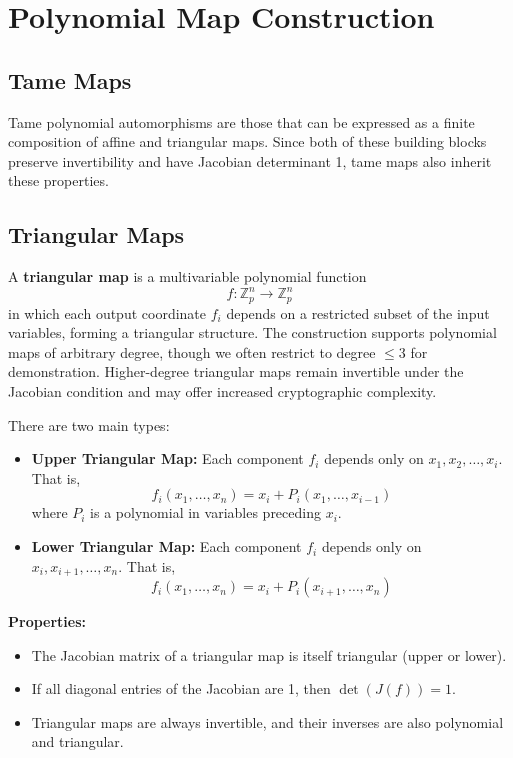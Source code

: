 \documentclass[12pt]{article}
\begin{document}
\section{Polynomial Map Construction}

\subsection*{Tame Maps}
Tame polynomial automorphisms are those that can be expressed as a finite composition of affine and triangular maps. Since both of these building blocks preserve invertibility and have Jacobian determinant 1, tame maps also inherit these properties.

\subsection*{Triangular Maps}

A \textbf{triangular map} is a multivariable polynomial function
\[
f : \mathbb{Z}_p^n \rightarrow \mathbb{Z}_p^n
\]
in which each output coordinate \( f_i \) depends on a restricted subset of the input variables, forming a triangular structure. The construction supports polynomial maps of arbitrary degree, though we often restrict to degree \( \leq 3 \) for demonstration. Higher-degree triangular maps remain invertible under the Jacobian condition and may offer increased cryptographic complexity.

There are two main types:

\begin{itemize}
    \item \textbf{Upper Triangular Map:} Each component \( f_i \) depends only on \( x_1, x_2, \dots, x_i \). That is,
    \[
    f_i(x_1, \dots, x_n) = x_i + P_i(x_1, \dots, x_{i-1})
    \]
    where \( P_i \) is a polynomial in variables preceding \( x_i \).

    \item \textbf{Lower Triangular Map:} Each component \( f_i \) depends only on \( x_i, x_{i+1}, \dots, x_n \). That is,
    \[
    f_i(x_1, \dots, x_n) = x_i + P_i(x_{i+1}, \dots, x_n)
    \]
\end{itemize}


\noindent
\textbf{Properties:}
\begin{itemize}
    \item The Jacobian matrix of a triangular map is itself triangular (upper or lower).
    \item If all diagonal entries of the Jacobian are 1, then \( \det(J(f)) = 1 \).
    \item Triangular maps are always invertible, and their inverses are also polynomial and triangular.
\end{itemize}
\end{document}
